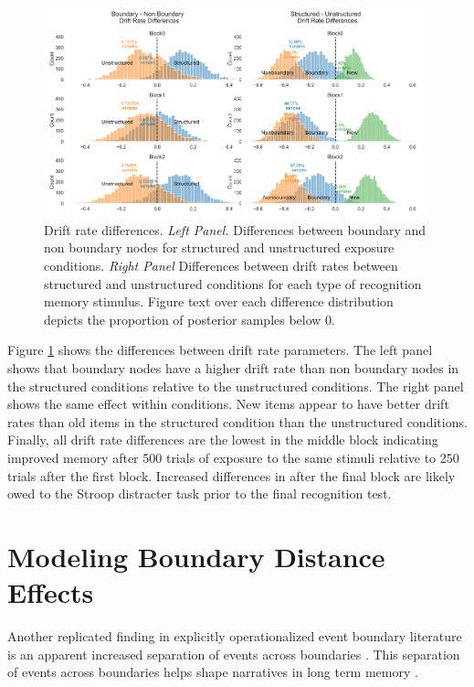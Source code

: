 \begin{figure}
    \centering
    \label{fig:ddm-drift-rates}
    \includegraphics[width = \textwidth]{chapter_notebooks/chapter_3/figures/ddm_vdiff_comb.png}
    \caption{Drift rate differences. \textit{Left Panel.} Differences between boundary and non boundary nodes for structured and unstructured exposure conditions. \textit{Right Panel} Differences between drift rates between structured and unstructured conditions for each type of recognition memory stimulus. Figure text over each difference distribution depicts the proportion of posterior samples below 0.}
\end{figure}

Figure \ref{fig:ddm-drift-rates} shows the differences between drift rate parameters. The left panel shows that boundary nodes have a higher drift rate than non boundary nodes in the structured conditions relative to the unstructured conditions. The right panel shows the same effect within conditions. New items appear to have better drift rates than old items in the structured condition than the unstructured conditions. Finally, all drift rate differences are the lowest in the middle block indicating improved memory after 500 trials of exposure to the same stimuli relative to 250 trials after the first block. Increased differences in after the final block are likely owed to the Stroop distracter task prior to the final recognition test. 



\section{Modeling Boundary Distance Effects}
Another replicated finding in explicitly operationalized event boundary literature is an apparent increased separation of events across boundaries \cite{horner2016role,brunec2018boundaries,dubrow2013influence, ezzyat2011constitutes, heusser2018perceptual}. This separation of events across boundaries helps shape narratives in long term memory \cite{clewett2019transcending}.

